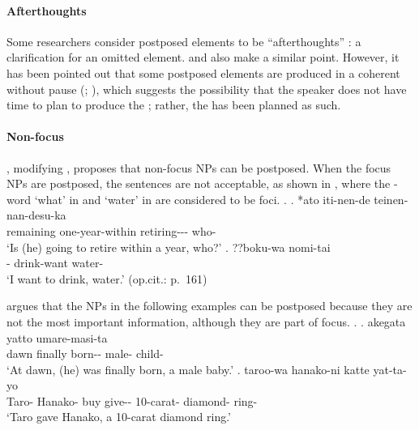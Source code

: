 \paragraph{Afterthoughts}

Some researchers consider postposed elements to be ``afterthoughts'' \cite[259]{shibatani90}:
a clarification for an omitted element.
 and  also make a similar point.
However,
it has been pointed out that
some postposed elements are produced in a coherent  without pause (; ),
which suggests the possibility that
the speaker does not have time to plan to produce the ;
rather, the  has been planned as such.




\paragraph{Non-focus}

,
modifying ,
proposes that non-focus NPs can be postposed.
When the focus NPs are postposed,
the sentences are not acceptable,
as shown in \Next,
where the -word  `what' in \Next[a] and
 `water' in \Next[b] are considered to be foci.
%
\ex.
 \ag. *ato iti-nen-de teinen-nan-desu-ka  \\
      remaining one-year-within retiring--- who- \\
      `Is (he) going to retire within a year, who?'
      \hfill{\cite[160]{takami95b}}      
 \bg. ??boku-wa nomi-tai  \\
      - drink-want water- \\
      `I want to drink, water.'
      \hfill{(op.cit.: p.~161)}

 argues that
the NPs in the following examples can be postposed because
they are not the most important information,
although they are part of focus.
%
\ex.
 \ag. akegata yatto umare-masi-ta   \\
      dawn finally born-- male- child- \\
      `At dawn, (he) was finally born, a male baby.'
 \bg. taroo-wa hanako-ni katte yat-ta-yo    \\
      Taro- Hanako- buy give-- 10-carat- diamond- ring- \\
      `Taro gave Hanako, a 10-carat diamond ring.'
      \hfill{\cite[236]{takami95a}}

